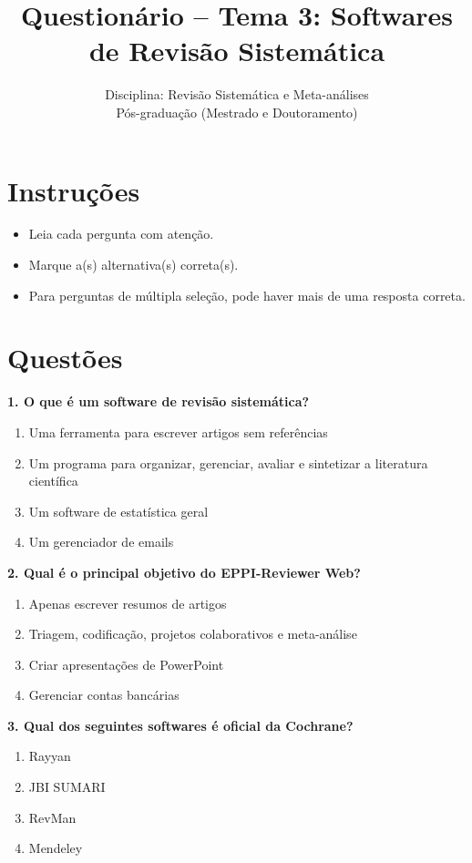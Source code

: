 \documentclass[12pt,a4paper]{article}
\title{Questionário – Tema 3: Softwares de Revisão Sistemática}
\author{Disciplina: Revisão Sistemática e Meta-análises\\Pós-graduação (Mestrado e Doutoramento)}
\date{}
\begin{document}
\maketitle

\section*{Instruções}
\begin{itemize}
    \item Leia cada pergunta com atenção.
    \item Marque a(s) alternativa(s) correta(s).
    \item Para perguntas de múltipla seleção, pode haver mais de uma resposta correta.
\end{itemize}

\section*{Questões}

\textbf{1. O que é um software de revisão sistemática?}
\begin{enumerate}[label=\alph*)]
    \item Uma ferramenta para escrever artigos sem referências
    \item Um programa para organizar, gerenciar, avaliar e sintetizar a literatura científica
    \item Um software de estatística geral
    \item Um gerenciador de emails
\end{enumerate}

\textbf{2. Qual é o principal objetivo do EPPI-Reviewer Web?}
\begin{enumerate}[label=\alph*)]
    \item Apenas escrever resumos de artigos
    \item Triagem, codificação, projetos colaborativos e meta-análise
    \item Criar apresentações de PowerPoint
    \item Gerenciar contas bancárias
\end{enumerate}

\textbf{3. Qual dos seguintes softwares é oficial da Cochrane?}
\begin{enumerate}[label=\alph*)]
    \item Rayyan
    \item JBI SUMARI
    \item RevMan
    \item Mendeley
\end{enumerate}
\end{document}
